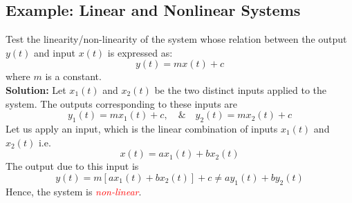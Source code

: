 \documentclass[../notes-main.tex]{subfiles}
\begin{document}
\subsection{Example: Linear and Nonlinear Systems}
Test the linearity/non-linearity of the system whose relation between the output \(y(t)\) and input \(x(t)\) is expressed as:
\begin{equation}
    y(t) = mx(t) + c
    \label{eq:linear-nonlinear-system-example-io-relation}
\end{equation}
\noindent where \(m\) is a constant.\\
\textbf{Solution:}
Let \(x_1(t)\) and \(x_2(t)\) be the two distinct inputs applied to the system. The outputs corresponding to these inputs are
\begin{equation}
    y_1(t) = mx_1(t) + c, \quad \& \quad y_2(t) = mx_2(t) + c
    \label{eq:linear-nonlinear-system-example-outputs}
\end{equation}
\noindent Let us apply an input, which is the linear combination of inputs \(x_1(t)\) and \(x_2(t)\) i.e.
\begin{equation}
    x(t) = ax_1(t) + bx_2(t)
    \label{eq:linear-nonlinear-system-example-input}
\end{equation}
\noindent The output due to this input is
\begin{equation}
    y(t) = m[ax_1(t) + bx_2(t)] + c \neq ay_1(t) + by_2(t)
\end{equation}
\noindent Hence, the system is \textcolor{red}{\emph{non-linear}}.
\end{document}
